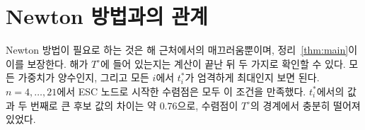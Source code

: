 \documentclass[11pt,a4paper]{article}
\theoremstyle{definition}
\theoremstyle{remark}
\begin{document}
\section{Newton 방법과의 관계}

Newton 방법이 필요로 하는 것은 해 근처에서의 매끄러움뿐이며, 정리~\ref{thm:main}이 이를 보장한다.
해가 $T^\circ$에 들어 있는지는 계산이 끝난 뒤 두 가지로 확인할 수 있다.
모든 가중치가 양수인지, 그리고 모든 $i$에서 $t^*_i$가 엄격하게 최대인지 보면 된다.
$n=4,\dots,21$에서 ESC 노드로 시작한 수렴점은 모두 이 조건을 만족했다.
$t^*_i$에서의 값과 두 번째로 큰 후보 값의 차이는 약 $0.76$으로, 수렴점이 $T^\circ$의 경계에서 충분히 떨어져 있었다.
\end{document}
